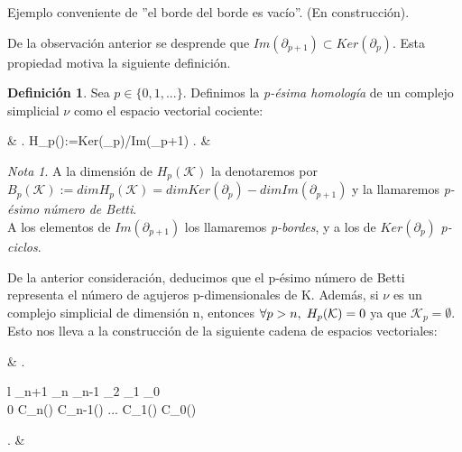 \documentclass[12pt, a4paper]{article}
\numberwithin{equation}{section}
\theoremstyle{definition}
\newtheorem{defi}{Definición}
\newenvironment{ejem}
  {\pushQED{\qed}\renewcommand{\qedsymbol}{$\blacktriangleleft$}\ejemplo}
  {\popQED\endejemplo}
\theoremstyle{remark}
\newtheorem*{remark}{Nota}
\theoremstyle{plain}
\begin{document}
		\begin{ejem}
		
			Ejemplo conveniente de ''el borde del borde es vacío''. (En construcción).

		\end{ejem}

		De la observación anterior se desprende que $Im(\partial_{p+1}) \subset Ker(\partial_{p})$. Esta propiedad motiva la siguiente definición.
		\begin{defi}
			Sea $p \in \{0,1,...\}$. Definimos la \textit{p-ésima homología} de un complejo simplicial {\Large $\nu$} como el espacio vectorial cociente:	
			\begin{flalign*}
				& \left.
				H_{p}():=Ker(\partial_{p})/Im(\partial_{p+1})
				\right. &
			\end{flalign*}
		\end{defi}

		\begin{remark}
			A la dimensión de $H_{p}(\mathcal{K})$ la denotaremos por $B_{p}(\mathcal{K}):=dim H_{p}(\mathcal{K})=dim Ker(\partial_{p})-dim Im(\partial_{p+1})$ y la llamaremos
			\textit{p-ésimo número de Betti}.\\
			A los elementos de $Im(\partial_{p+1})$ los llamaremos \textit{p-bordes}, y a los de $Ker(\partial_{p})$ \textit{p-ciclos}.
		\end{remark}

		De la anterior consideración, deducimos que el p-ésimo número de Betti representa el número de agujeros p-dimensionales de K. Además, si {\Large $\nu$} es un complejo simplicial
		de dimensión n, entonces $\forall p > n,\hspace{0.1cm} H_{p}(\mathcal{K})=0$ ya que $\mathcal{K}_{p}=\emptyset$. Esto nos lleva a la construcción de la siguiente cadena de 
		espacios vectoriales:
		\begin{flalign*}
			& \left.
			\begin{array}{l}
				\hspace{0.1cm} \partial_{n+1} \hspace{1.1cm} \partial_{n} \hspace{1.4cm} \partial_{n-1} \hspace{0.9cm} \partial_{2} \hspace{1.3cm} \partial_{1} \hspace{1.2cm} \partial_{0}\\
				0 \rightarrow C_{n}() \rightarrow C_{n-1}() \rightarrow \hspace{0.25cm} ... \hspace{0.25cm} \rightarrow C_{1}() \rightarrow C_{0}() \rightarrow 0
			\end{array}
			\right. &
		\end{flalign*}
\end{document}
